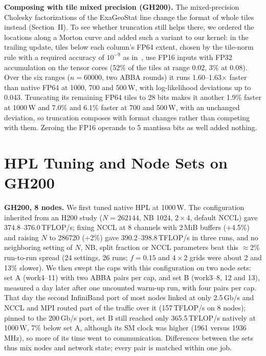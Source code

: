 \documentclass[conference]{IEEEtran}
\newcommand{\W}{\,W}
\newcommand{\pct}{\%}
\begin{document}
\textbf{Composing with tile mixed precision (GH200).} The mixed-precision Cholesky factorizations of the ExaGeoStat line change
the format of whole tiles instead (Section~II). To see whether truncation still helps there, we ordered
the locations along a Morton curve and added such a variant to our kernel: in the trailing update, tiles below each
column's FP64 extent, chosen by the tile-norm rule with a required accuracy of $10^{-9}$ as in~\cite{Cao2023}, use FP16
inputs with FP32 accumulation on the tensor cores (52\pct{} of the tiles at range 0.02, 3\pct{} at 0.08). Over the six
ranges ($n=60000$, two ABBA rounds) it runs 1.60--1.63$\times$ faster than native FP64 at 1000, 700 and 500\W, with
log-likelihood deviations up to 0.043. Truncating its remaining FP64 tiles to 28 bits makes it another 1.9\pct{}
faster at 1000\W{} and 7.0\pct{} and 6.1\pct{} faster at 700 and 500\W, with an unchanged deviation, so truncation
composes with format changes rather than competing with them. Zeroing the FP16 operands to 5 mantissa bits as well
added nothing.

\section{HPL Tuning and Node Sets on GH200}\label{sec:hpltune}
\textbf{GH200, 8 nodes.} We first tuned native HPL at 1000\W. The configuration inherited from an H200 study ($N=262144$, NB 1024,
$2\times4$, default NCCL) gave 374.8--376.0\,TFLOP/s; fixing NCCL at 8 channels with 2\,MiB buffers (+4.5\pct) and
raising $N$ to 286720 (+2\pct) gave 390.2--398.8\,TFLOP/s in three runs, and no neighboring setting of $N$, NB, split
fraction or NCCL parameters beat this ${\approx}2\pct$ run-to-run spread (24 settings, 26 runs; $f=0.15$ and
$4\times2$ grids were about 2 and 13\pct{} slower). We then swept the caps with this configuration on two node sets: set
A (work4--11) with two ABBA pairs per cap, and set B (work3--8, 12 and 13), measured a day later after one uncounted
warm-up run, with four pairs per cap. That day the second InfiniBand port of most nodes linked at only 2.5\,Gb/s and
NCCL and MPI routed part of the traffic over it (157\,TFLOP/s on 8 nodes); pinned to the 200\,Gb/s port, set B still
reached only 365.5\,TFLOP/s natively at 1000\W, 7\pct{} below set A, although its SM clock was higher (1961 versus
1936\,MHz), so more of its time went to communication. Differences between the sets thus mix nodes and network state; every
pair is matched within one job.
\end{document}
